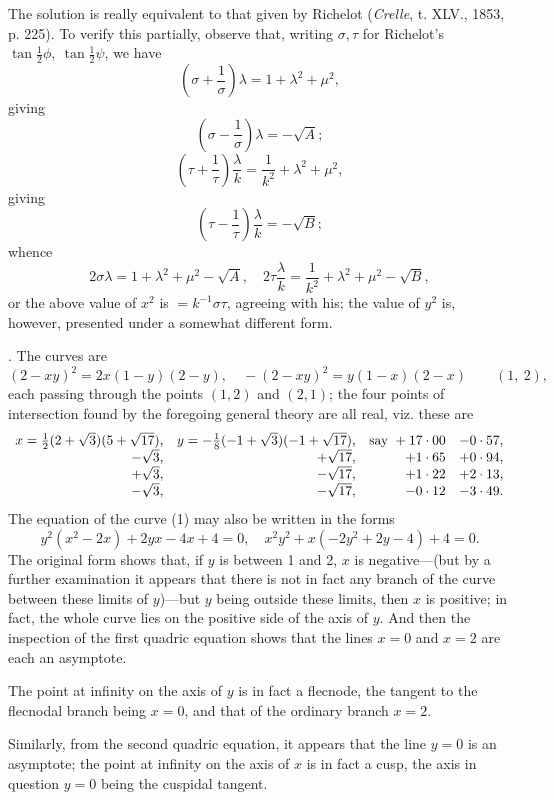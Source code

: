 \documentclass[10pt,twoside]{article}
\begin{document}
The solution is really equivalent to that given by Richelot (\textit{Crelle}, t. XLV., 1853, p. 225). To verify this partially, observe that, writing \(\sigma,\tau\) for Richelot's \(\tan\frac12\phi,\ \tan\frac12\psi\), we have
\[
\left(\sigma+\frac{1}{\sigma}\right)\lambda=1+\lambda^2+\mu^2,
\]
giving
\[
\left(\sigma-\frac{1}{\sigma}\right)\lambda=-\sqrt A;
\]
\[
\left(\tau+\frac{1}{\tau}\right)\frac{\lambda}{k}
=\frac{1}{k^2}+\lambda^2+\mu^2,
\]
giving
\[
\left(\tau-\frac{1}{\tau}\right)\frac{\lambda}{k}=-\sqrt B;
\]
whence
\[
2\sigma\lambda=1+\lambda^2+\mu^2-\sqrt A,\quad
2\tau\frac{\lambda}{k}=\frac{1}{k^2}+\lambda^2+\mu^2-\sqrt B,
\]
or the above value of \(x^2\) is \(=k^{-1}\sigma\tau\), agreeing with his; the value of \(y^2\) is, however, presented under a somewhat different form.
\newpage

. The curves are
\[
(2-xy)^2=2x(1-y)(2-y),\quad
-(2-xy)^2=y(1-x)(2-x) \qquad (1,\ 2),
\]
each passing through the points \((1,2)\) and \((2,1)\); the four points of intersection found by the foregoing general theory are all real, viz. these are
\[
\begin{array}{r@{\quad}r@{\quad}r@{\quad}r}
x=\frac12(2+\sqrt3)(5+\sqrt{17}),&
y=-\frac18(-1+\sqrt3)(-1+\sqrt{17}),&
\hbox{say }+17\cdot00&-0\cdot57,\\
-\sqrt3,&+\sqrt{17},&+1\cdot65&+0\cdot94,\\
+\sqrt3,&-\sqrt{17},&+1\cdot22&+2\cdot13,\\
-\sqrt3,&-\sqrt{17},&-0\cdot12&-3\cdot49.
\end{array}
\]
The equation of the curve (1) may also be written in the forms
\[
y^2(x^2-2x)+2yx-4x+4=0,\quad
x^2y^2+x(-2y^2+2y-4)+4=0.
\]
The original form shows that, if \(y\) is between 1 and 2, \(x\) is negative---(but by a further examination it appears that there is not in fact any branch of the curve between these limits of \(y\))---but \(y\) being outside these limits, then \(x\) is positive; in fact, the whole curve lies on the positive side of the axis of \(y\). And then the inspection of the first quadric equation shows that the lines \(x=0\) and \(x=2\) are each an asymptote.

The point at infinity on the axis of \(y\) is in fact a flecnode, the tangent to the flecnodal branch being \(x=0\), and that of the ordinary branch \(x=2\).

Similarly, from the second quadric equation, it appears that the line \(y=0\) is an asymptote; the point at infinity on the axis of \(x\) is in fact a cusp, the axis in question \(y=0\) being the cuspidal tangent.
\end{document}
